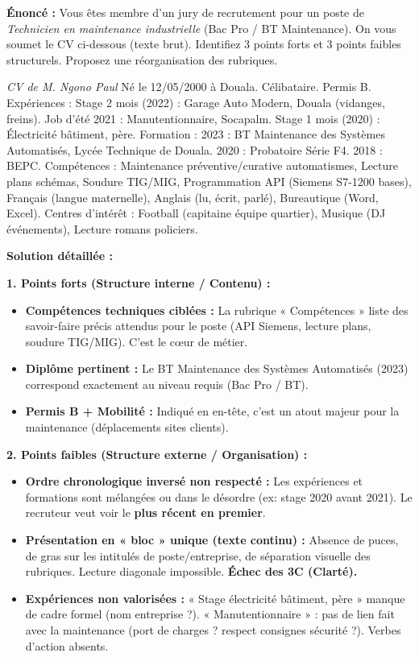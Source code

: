 \documentclass[11pt]{article}
\newcommand{\cle}[1]{{\popxbold\color{popdark}#1}}
\begin{document}
\begin{exoresolu}
    \textbf{Énoncé :} Vous êtes membre d'un jury de recrutement pour un poste de \emph{Technicien en maintenance industrielle} (Bac Pro / BT Maintenance). On vous soumet le CV ci-dessous (texte brut). Identifiez 3 points forts et 3 points faibles structurels. Proposez une réorganisation des rubriques.

    \textit{CV de M. Ngono Paul}
    Né le 12/05/2000 à Douala. Célibataire. Permis B.
    Expériences : Stage 2 mois (2022) : Garage Auto Modern, Douala (vidanges, freins). Job d'été 2021 : Manutentionnaire, Socapalm. Stage 1 mois (2020) : Électricité bâtiment, père.
    Formation : 2023 : BT Maintenance des Systèmes Automatisés, Lycée Technique de Douala. 2020 : Probatoire Série F4. 2018 : BEPC.
    Compétences : Maintenance préventive/curative automatismes, Lecture plans schémas, Soudure TIG/MIG, Programmation API (Siemens S7-1200 bases), Français (langue maternelle), Anglais (lu, écrit, parlé), Bureautique (Word, Excel).
    Centres d'intérêt : Football (capitaine équipe quartier), Musique (DJ événements), Lecture romans policiers.

    \tcblower
    \textbf{Solution détaillée :}

    \textbf{1. Points forts (Structure interne / Contenu) :}
    \begin{itemize}
        \item \textbf{Compétences techniques ciblées :} La rubrique « Compétences » liste des savoir-faire précis attendus pour le poste (API Siemens, lecture plans, soudure TIG/MIG). C'est le \cle{cœur de métier}.
        \item \textbf{Diplôme pertinent :} Le BT Maintenance des Systèmes Automatisés (2023) correspond exactement au niveau requis (Bac Pro / BT).
        \item \textbf{Permis B + Mobilité :} Indiqué en en-tête, c'est un atout majeur pour la maintenance (déplacements sites clients).
    \end{itemize}

    \textbf{2. Points faibles (Structure externe / Organisation) :}
    \begin{itemize}
        \item \textbf{Ordre chronologique inversé non respecté :} Les expériences et formations sont mélangées ou dans le désordre (ex: stage 2020 avant 2021). Le recruteur veut voir le \textbf{plus récent en premier}.
        \item \textbf{Présentation en « bloc » unique (texte continu) :} Absence de puces, de gras sur les intitulés de poste/entreprise, de séparation visuelle des rubriques. Lecture diagonale impossible. \textbf{Échec des 3C (Clarté).}
        \item \textbf{Expériences non valorisées :} « Stage électricité bâtiment, père » manque de cadre formel (nom entreprise ?). « Manutentionnaire » : pas de lien fait avec la maintenance (port de charges ? respect consignes sécurité ?). Verbes d'action absents.
    \end{itemize}


\end{exoresolu}
\end{document}
